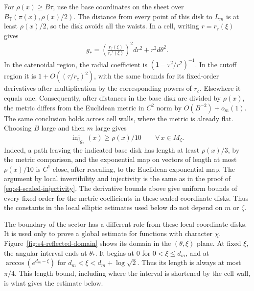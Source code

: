 \documentclass[a4paper,11pt,oneside,reqno]{amsart}
\numberwithin{equation}{section}
\theoremstyle{definition}
\begin{document}
For $\rho(x)\geq B\tau$, use the base coordinates
on the sheet over
$B_{\mathbb T}(\pi(x),\rho(x)/2)$.
The distance from every point of this disk to $L_m$
is at least $\rho(x)/2$, so the disk avoids all the
waists. In a cell, writing $r=r_\tau(\xi)$ gives
%
\begin{align*}
    g_*=
       \left(\frac{r_\tau(\xi)}{r_\tau'(\xi)}\right)^2
       dr^2+r^2d\theta^2.
\end{align*}
%
In the catenoidal region, the radial coefficient is
$(1-\tau^2/r^2)^{-1}$. In the cutoff region it is
$1+O((\tau/r_c)^2)$, with the same bounds for its
fixed-order derivatives after multiplication by the
corresponding powers of $r_c$. Elsewhere it equals
one. Consequently, after distances in the base disk
are divided by $\rho(x)$, the metric differs from
the Euclidean metric in $C^2$ norm by
$O(B^{-2})+o_m(1)$. The same conclusion holds across
cell walls, where the metric is already flat.
Choosing $B$ large and then $m$ large gives
%
\begin{align*}
    \operatorname{inj}_{g_*}(x)\geq\rho(x)/10
    \qquad\forall\,x\in M_\zeta.
\end{align*}
%
Indeed, a path leaving the indicated base disk has
length at least $\rho(x)/3$, by the metric comparison,
and the exponential map on vectors of length at most
$\rho(x)/10$ is $C^1$ close, after rescaling, to the
Euclidean exponential map. The argument by local
invertibility and injectivity is the same as in the
proof of \eqref{eq:s4-scaled-injectivity}.
The derivative bounds above give uniform bounds of
every fixed order for the metric coefficients in
these scaled coordinate disks. Thus the constants
in the local elliptic estimates used below do not
depend on $m$ or $\zeta$.

The boundary of the sector has a different role from
these local coordinate disks. It is used only to
prove a global estimate for functions with character
$\chi$. Figure~\ref{fig:s4-reflected-domain} shows
its domain in the $(\theta,\xi)$ plane. At fixed
$\xi$, the angular interval ends at $\theta_*$.
It begins at $0$ for $0<\xi\leq d_m$, and at
$\arccos(e^{d_m-\xi})$ for
$d_m<\xi<d_m+\log\sqrt2$. Thus its length is
always at most $\pi/4$. This length bound, including
where the interval is shortened by the cell wall,
is what gives the estimate below.
\end{document}
